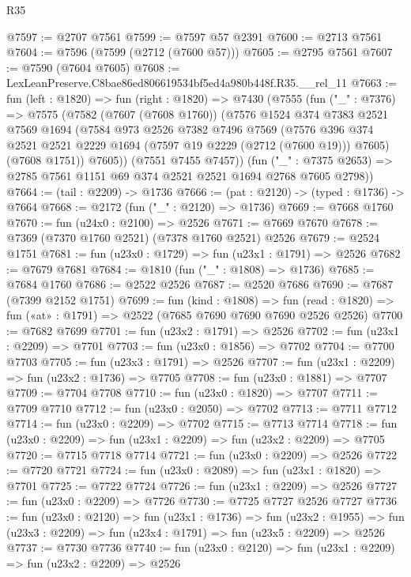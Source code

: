 \begin{lexlean}{R35}
\begin{coremodule}
@7597 := @2707 @7561
@7599 := @7597 @57 @2391
@7600 := @2713 @7561
@7604 := @7596 (@7599 (@2712 (@7600 @57)))
@7605 := @2795 @7561
@7607 := @7590 (@7604 @7605)
@7608 := LexLeanPreserve.C8bae86ed806619534bf5ed4a980b448f.R35.__rel_11
@7663 := fun (left : @1820) =>
  fun (right : @1820) =>
  @7430
    (@7555
      (fun ("_" : @7376) =>
      @7575
        (@7582
          (@7607 (@7608 @1760))
          (@7576
            @1524
            @374
            @7383
            @2521
            @7569
            @1694
            (@7584
              @973
              @2526
              @7382
              @7496
              @7569
              (@7576 @396 @374 @2521 @2521 @2229 @1694 (@7597 @19 @2229 (@2712 (@7600 @19))) @7605)
              (@7608 @1751))
            @7605))
        (@7551 @7455 @7457))
      (fun ("_" : @7375 @2653) => @2785 @7561 @1151 @69 @374 @2521 @2521 @1694 @2768 @7605 @2798))
@7664 := (tail : @2209) -> @1736
@7666 := (pat : @2120) -> (typed : @1736) -> @7664
@7668 := @2172 (fun ("_" : @2120) => @1736)
@7669 := @7668 @1760
@7670 := fun (u24x0 : @2100) => @2526
@7671 := @7669 @7670
@7678 := @7369 (@7370 @1760 @2521) (@7378 @1760 @2521) @2526
@7679 := @2524 @1751
@7681 := fun (u23x0 : @1729) => fun (u23x1 : @1791) => @2526
@7682 := @7679 @7681
@7684 := @1810 (fun ("_" : @1808) => @1736)
@7685 := @7684 @1760
@7686 := @2522 @2526
@7687 := @2520 @7686
@7690 := @7687 (@7399 @2152 @1751)
@7699 := fun (kind : @1808) =>
  fun (read : @1820) => fun («at» : @1791) => @2522 (@7685 @7690 @7690 @7690 @2526 @2526)
@7700 := @7682 @7699
@7701 := fun (u23x2 : @1791) => @2526
@7702 := fun (u23x1 : @2209) => @7701
@7703 := fun (u23x0 : @1856) => @7702
@7704 := @7700 @7703
@7705 := fun (u23x3 : @1791) => @2526
@7707 := fun (u23x1 : @2209) => fun (u23x2 : @1736) => @7705
@7708 := fun (u23x0 : @1881) => @7707
@7709 := @7704 @7708
@7710 := fun (u23x0 : @1820) => @7707
@7711 := @7709 @7710
@7712 := fun (u23x0 : @2050) => @7702
@7713 := @7711 @7712
@7714 := fun (u23x0 : @2209) => @7702
@7715 := @7713 @7714
@7718 := fun (u23x0 : @2209) => fun (u23x1 : @2209) => fun (u23x2 : @2209) => @7705
@7720 := @7715 @7718 @7714
@7721 := fun (u23x0 : @2209) => @2526
@7722 := @7720 @7721
@7724 := fun (u23x0 : @2089) => fun (u23x1 : @1820) => @7701
@7725 := @7722 @7724
@7726 := fun (u23x1 : @2209) => @2526
@7727 := fun (u23x0 : @2209) => @7726
@7730 := @7725 @7727 @2526 @7727
@7736 := fun (u23x0 : @2120) =>
  fun (u23x1 : @1736) =>
  fun (u23x2 : @1955) => fun (u23x3 : @2209) => fun (u23x4 : @1791) => fun (u23x5 : @2209) => @2526
@7737 := @7730 @7736
@7740 := fun (u23x0 : @2120) => fun (u23x1 : @2209) => fun (u23x2 : @2209) => @2526

\end{coremodule}
\end{lexlean}

